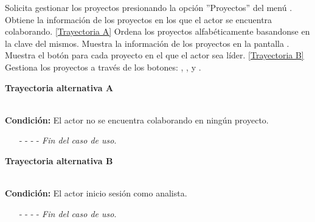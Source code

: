 \begin{UCtrayectoria}
	\UCpaso[\UCactor] Solicita gestionar los proyectos presionando la opción ''Proyectos'' del menú .
	\UCpaso[\UCsist] Obtiene la información de los proyectos en los que el actor se encuentra colaborando. \hyperlink{CU4:TAA}{[Trayectoria A]}
	\UCpaso[\UCsist] Ordena los proyectos alfabéticamente basandonse en la clave del mismos.
	\UCpaso[\UCsist] Muestra la información de los proyectos en la pantalla . \label{CU4-P3}
	\UCpaso[\UCsist] Muestra el botón  para cada proyecto en el que el actor sea líder. \hyperlink{CU4:TAB}{[Trayectoria B]}
	\UCpaso[\UCactor] Gestiona los proyectos a través de los botones: , ,  y . \label{CU4-P5}
\end{UCtrayectoria}		
\hypertarget{CU4:TAA}{\textbf{Trayectoria alternativa A}}\\
\noindent \textbf{Condición:} El actor no se encuentra colaborando en ningún proyecto.
\begin{enumerate}
	\UCpaso[\UCsist] Muestra el mensaje  en la pantalla  para indicar que no hay registros de proyectos para mostrar.
	\item[- -] - - {\em {Fin del caso de uso}}.%
\end{enumerate}


\hypertarget{CU4:TAB}{\textbf{Trayectoria alternativa B}}\\
\noindent \textbf{Condición:} El actor inicio sesión como analista.
\begin{enumerate}
	\UCpaso[\UCactor] Gestiona los proyectos a través de las botones: ,  y . \label{CU4-TB1}
	\item[- -] - - {\em {Fin del caso de uso}}.%
\end{enumerate}

